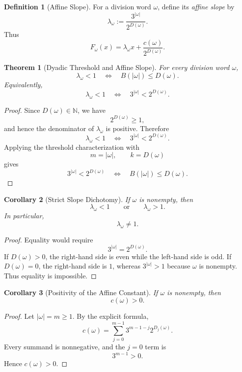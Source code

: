 \documentclass[12pt, oneside]{article}
\numberwithin{equation}{section}
\theoremstyle{definition}
\newtheorem{definition}{Definition}[section]
\theoremstyle{plain}
\newtheorem{theorem}{Theorem}[section]
\newtheorem{corollary}[theorem]{Corollary}
\theoremstyle{remark}
\begin{document}
\begin{definition}[Affine Slope]
For a division word \(\omega\), define its \emph{affine slope} by
\[
\lambda_\omega
:=
\frac{3^{|\omega|}}{2^{D(\omega)}}.
\]
Thus
\[
F_\omega(x)
=
\lambda_\omega x
+
\frac{c(\omega)}{2^{D(\omega)}}.
\]
\end{definition}

\begin{theorem}[Dyadic Threshold and Affine Slope]
For every division word \(\omega\),
\[
\lambda_\omega<1
\quad\Longleftrightarrow\quad
B(|\omega|)\le D(\omega).
\]
Equivalently,
\[
\lambda_\omega<1
\quad\Longleftrightarrow\quad
3^{|\omega|}<2^{D(\omega)}.
\]
\end{theorem}

\begin{proof}
Since \(D(\omega)\in\mathbb N\), we have
\[
2^{D(\omega)}\ge1,
\]
and hence the denominator of \(\lambda_\omega\) is positive. Therefore
\[
\lambda_\omega<1
\quad\Longleftrightarrow\quad
3^{|\omega|}<2^{D(\omega)}.
\]
Applying the threshold characterization with
\[
m=|\omega|,
\qquad
k=D(\omega)
\]
gives
\[
3^{|\omega|}<2^{D(\omega)}
\quad\Longleftrightarrow\quad
B(|\omega|)\le D(\omega).
\]
\end{proof}

\begin{corollary}[Strict Slope Dichotomy]
If \(\omega\) is nonempty, then
\[
\lambda_\omega<1
\qquad\text{or}\qquad
\lambda_\omega>1.
\]
In particular,
\[
\lambda_\omega\ne1.
\]
\end{corollary}

\begin{proof}
Equality would require
\[
3^{|\omega|}=2^{D(\omega)}.
\]
If \(D(\omega)>0\), the right-hand side is even while the left-hand side
is odd. If \(D(\omega)=0\), the right-hand side is \(1\), whereas
\(3^{|\omega|}>1\) because \(\omega\) is nonempty. Thus equality is
impossible.
\end{proof}

\begin{corollary}[Positivity of the Affine Constant]
If \(\omega\) is nonempty, then
\[
c(\omega)>0.
\]
\end{corollary}

\begin{proof}
Let \(|\omega|=m\ge1\). By the explicit formula,
\[
c(\omega)
=
\sum_{j=0}^{m-1}
3^{m-1-j}2^{D_j(\omega)}.
\]
Every summand is nonnegative, and the \(j=0\) term is
\[
3^{m-1}>0.
\]
Hence \(c(\omega)>0\).
\end{proof}
\end{document}
